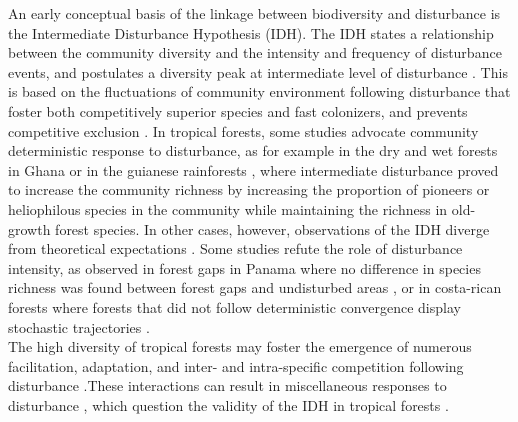 \documentclass[fleqn,10pt]{ArtEcoFoG} %
\begin{document}
An early conceptual basis of the linkage between biodiversity and disturbance is the Intermediate Disturbance Hypothesis (IDH).
The IDH states a relationship between the community diversity and the intensity and frequency of disturbance events, and postulates a diversity peak at intermediate level of disturbance \citep{Connell1978}.
This is based on the fluctuations of community environment following disturbance that foster both competitively superior species and fast colonizers, and prevents competitive exclusion \citep{Shea2004, Pulsford2016}.
\color{red}
In tropical forests, some studies advocate community deterministic response to disturbance, as for example in the dry and wet forests in Ghana \citep{Bongers2009} or in the guianese rainforests \citep{Molino2001}, where intermediate disturbance proved to increase the community richness by increasing the proportion of pioneers or heliophilous species in the community while maintaining the richness in old-growth forest species. In other cases, however, observations of the IDH diverge from theoretical expectations \citep{Hugues2007, Sheil2003, Norden2017}. Some studies refute the role of disturbance intensity, as observed in forest gaps in Panama where no difference in species richness was found between forest gaps and undisturbed areas \citep{Hubbell2001}, or in costa-rican forests where forests that did not follow deterministic convergence display stochastic trajectories \citep{Norden2015}.\\
The high diversity of tropical forests may foster the emergence of numerous facilitation, adaptation, and inter- and intra-specific competition following disturbance \citep{Garcia_florez2017, Bongers2009}.These interactions can result in miscellaneous responses to disturbance \citep{Lindenmayer2012}, which question the validity of the IDH in tropical forests \citep{Hubbell2001, Fox2013, Sheil2013}.
\color{black}
\end{document}
